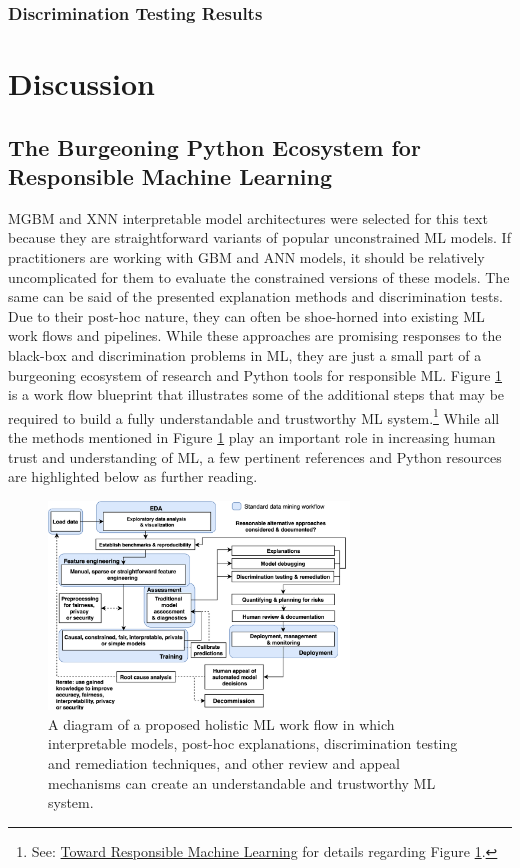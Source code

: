 \documentclass[information,article,submit,moreauthors,pdftex]{definitions/mdpi}
\begin{document}
\subsubsection{Discrimination Testing Results}

\section{Discussion}\label{sec:disc}

\subsection{The Burgeoning Python Ecosystem for Responsible Machine Learning}

MGBM and XNN interpretable model architectures were selected for this text because they are straightforward variants of popular unconstrained ML models. If practitioners are working with GBM and ANN models, it should be relatively uncomplicated for them to evaluate the constrained versions of these models. The same can be said of the presented explanation methods and discrimination tests. Due to their post-hoc nature, they can often be shoe-horned into existing ML work flows and pipelines. While these approaches are promising responses to the black-box and discrimination problems in ML, they are just a small part of a burgeoning ecosystem of research and Python tools for responsible ML. Figure \ref{fig:blueprint} is a work flow blueprint that illustrates some of the additional steps that may be required to build a fully understandable and trustworthy ML system.\footnote{See: \href{https://github.com/jphall663/hc_ml}{Toward Responsible Machine Learning} for details regarding Figure \ref{fig:blueprint}.} While all the methods mentioned in Figure \ref{fig:blueprint} play an important role in increasing human trust and understanding of ML, a few pertinent references and Python resources are highlighted below as further reading. 

\begin{figure}[H]
\centering
\includegraphics[width=8cm]{img/blueprint.png}
\caption{A diagram of a proposed holistic ML work flow in which interpretable models, post-hoc explanations, discrimination testing and remediation techniques, and other review and appeal mechanisms can create an understandable and trustworthy ML system.}
\label{fig:blueprint}
\end{figure}   
\end{document}
